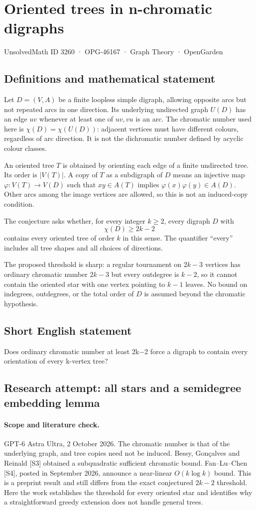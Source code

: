 \documentclass[11pt,a4paper]{article}
\begin{document}
\section*{Oriented trees in n-chromatic digraphs}\label{3260}
{\small UnsolvedMath ID 3260 · OPG-46167 · Graph Theory · OpenGarden}
\subsection{Definitions and mathematical statement}
Let $D=(V,A)$ be a finite loopless simple digraph, allowing opposite arcs
but not repeated arcs in one direction. Its underlying undirected graph
$U(D)$ has an edge $uv$ whenever at least one of $uv,vu$ is an arc.
The chromatic number used here is $\chi(D)=\chi(U(D))$: adjacent vertices
must have different colours, regardless of arc direction. It is not
the dichromatic number defined by acyclic colour classes.

An oriented tree $T$ is obtained by orienting each edge of a finite
undirected tree. Its order is $|V(T)|$. A copy of $T$ as a subdigraph of
$D$ means an injective map $\varphi:V(T)\to V(D)$ such that
$xy\in A(T)$ implies $\varphi(x)\varphi(y)\in A(D)$. Other arcs among
the image vertices are allowed, so this is not an induced-copy condition.

The conjecture asks whether, for every integer $k\ge2$, every digraph
$D$ with
\[
                            \chi(D)\ge2k-2
\]
contains every oriented tree of order $k$ in this sense. The quantifier
``every'' includes all tree shapes and all choices of directions.

The proposed threshold is sharp: a regular tournament on $2k-3$ vertices
has ordinary chromatic number $2k-3$ but every outdegree is $k-2$, so it
cannot contain the oriented star with one vertex pointing to $k-1$
leaves. No bound on indegrees, outdegrees, or the total order of $D$
is assumed beyond the chromatic hypothesis.
\subsection{Short English statement}
Does ordinary chromatic number at least 2k−2 force a digraph to contain every orientation of every k-vertex tree?
\subsection{Research attempt: all stars and a semidegree embedding lemma}
\paragraph{Scope and literature check.}
GPT-6 Astra Ultra, 2 October 2026. The chromatic number is that of the
underlying graph, and tree copies need not be induced. Bessy,
Gon\c calves and Reinald [S3] obtained a subquadratic sufficient
chromatic bound. Fan--Lu--Chen [S4], posted in September 2026, announce
a near-linear $O(k\log k)$ bound. This is a preprint result and still
differs from the exact conjectured $2k-2$ threshold. Here the work
establishes the threshold for every oriented star and identifies why
a straightforward greedy extension does not handle general trees.
\end{document}
